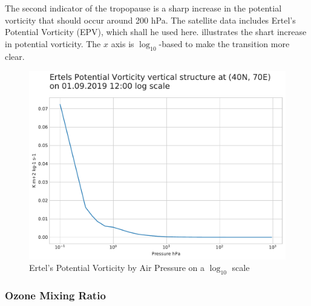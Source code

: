 \documentclass[../00_main.tex]{subfiles}
\begin{document}
The second indicator of the tropopause is a sharp increase in the potential
vorticity that should occur around 200 hPa. The satellite data includes Ertel's
Potential Vorticity (EPV), which shall he used here.  illustrates 
the shart increase in potential vorticity. The $x$ axis is $\log_{10}$-based to
make the transition more clear.
\begin{figure}[H]
\center
    \includegraphics[width=\textwidth]{../graphics/epv_log}
    \vspace{-20pt}
    \caption{Ertel's Potential Vorticity by Air Pressure on a $\log_{10}$ scale}
    \label{epv}
\end{figure}

\subsubsection{Ozone Mixing Ratio}
\end{document}
